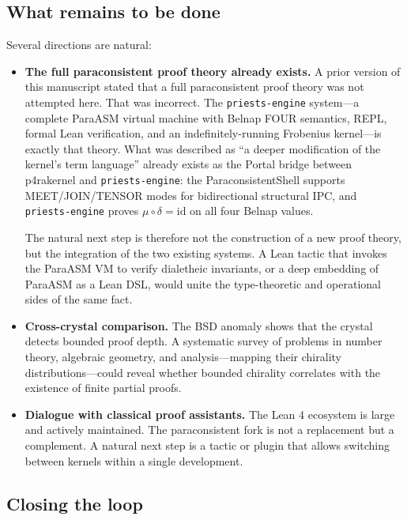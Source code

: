 \documentclass[11pt,a4paper]{article}
\theoremstyle{definition}
\begin{document}
\subsection{What remains to be done}

Several directions are natural:

\begin{itemize}
  \item {\bf The full paraconsistent proof theory already exists.} A prior
        version of this manuscript stated that a full paraconsistent proof theory
        was not attempted here. That was incorrect. The {\tt priests-engine}
        system---a complete ParaASM virtual machine with Belnap FOUR semantics,
        REPL, formal Lean verification, and an indefinitely-running Frobenius
        kernel---is exactly that theory. What was described as ``a deeper
        modification of the kernel's term language'' already exists as the Portal
        bridge between p4rakernel and {\tt priests-engine}: the
        ParaconsistentShell supports MEET/JOIN/TENSOR modes for bidirectional
        structural IPC, and {\tt priests-engine} proves $\mu \circ \delta =
        \text{id}$ on all four Belnap values.

        The natural next step is therefore not the construction of a new proof
        theory, but the integration of the two existing systems. A Lean tactic
        that invokes the ParaASM VM to verify dialetheic invariants, or a deep
        embedding of ParaASM as a Lean DSL, would unite the type-theoretic and
        operational sides of the same fact.

  \item {\bf Cross-crystal comparison.} The BSD anomaly shows that the crystal
        detects bounded proof depth. A systematic survey of problems in
        number theory, algebraic geometry, and analysis---mapping their
        chirality distributions---could reveal whether bounded chirality
        correlates with the existence of finite partial proofs.

  \item {\bf Dialogue with classical proof assistants.} The Lean 4 ecosystem
        is large and actively maintained. The paraconsistent fork is not a
        replacement but a complement. A natural next step is a tactic or plugin
        that allows switching between kernels within a single development.
\end{itemize}

\subsection{Closing the loop}
\end{document}
